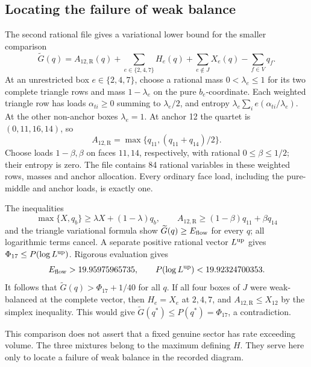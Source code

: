 \documentclass[11pt]{article}
\numberwithin{equation}{section}
\theoremstyle{definition}\newtheorem{definition}[theorem]{Definition}
\theoremstyle{remark}\newtheorem{remark}[theorem]{Remark}
\newcommand{\Rgt}{\mathrm R}
\begin{document}
\subsection{Locating the failure of weak balance}
The second rational file \cite{AnchorData} gives a variational
lower bound for the smaller comparison
\begin{equation}\label{pc:restricted}
 \widetilde G(q)=A_{12,\Rgt}(q)+
       \sum_{e\in\{2,4,7\}}H_e(q)+
       \sum_{e\notin J}X_e(q)-\sum_{f\in V}q_f.
\end{equation}
At an unrestricted box \(e\in\{2,4,7\}\), choose a rational mass
\(0<\lambda_e\le1\) for its two complete triangle rows and mass
\(1-\lambda_e\) on the pure \(b_e\)-coordinate. Each weighted
triangle row has loads \(\alpha_{ti}\ge0\) summing to
\(\lambda_e/2\), and entropy
\(\lambda_e\sum_i e(\alpha_{ti}/\lambda_e)\).
At the other non-anchor boxes \(\lambda_e=1\).
At anchor 12 the quartet is \((0,11,16,14)\), so
\[
 A_{12,\Rgt}=\max\{q_{11},(q_{11}+q_{14})/2\}.
\]
Choose loads \(1-\beta,\beta\) on faces \(11,14\), respectively,
with rational \(0\le\beta\le1/2\); their entropy is zero.
The file contains 84 rational variables in these weighted rows,
masses and anchor allocation. Every ordinary face load, including
the pure-middle and anchor loads, is exactly one.

The inequalities
\[
 \max\{X,q_b\}\ge\lambda X+(1-\lambda)q_b,\qquad
 A_{12,\Rgt}\ge(1-\beta)q_{11}+\beta q_{14}
\]
and the triangle variational formula show
\(\widetilde G(q)\ge E_{\rm flow}\) for every \(q\);
all logarithmic terms cancel. A separate positive rational vector
\(L^{\rm up}\) gives \(\Phi_{17}\le P(\log L^{\rm up})\).
Rigorous evaluation gives
\begin{equation}\label{pc:seed-obstruction-values}
 E_{\rm flow}>19.95975965735,\qquad
 P(\log L^{\rm up})<19.92324700353.
\end{equation}
It follows that \(\widetilde G(q)>\Phi_{17}+1/40\) for all \(q\).
If all four boxes of \(J\) were weak-balanced at the complete
vector, then \(H_e=X_e\) at \(2,4,7\), and
\(A_{12,\Rgt}\le X_{12}\) by the simplex inequality.
This would give \(\widetilde G(q^*)\le P(q^*)=\Phi_{17}\),
a contradiction.

This comparison does not assert that a fixed genuine sector has
rate exceeding volume. The three mixtures belong to the maximum defining $H$. They serve here only to locate a failure
of weak balance in the recorded diagram.
\end{document}
